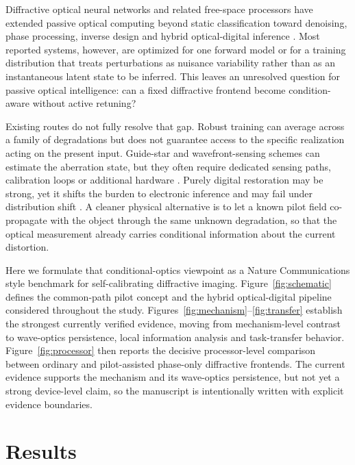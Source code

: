 \documentclass[11pt]{article}
\begin{document}
Diffractive optical neural networks and related free-space processors have extended passive optical computing beyond static classification toward denoising, phase processing, inverse design and hybrid optical-digital inference \cite{ref14,ref15,ref16,ref17,ref18,ref19,ref20,ref21,ref22,ref23}. Most reported systems, however, are optimized for one forward model or for a training distribution that treats perturbations as nuisance variability rather than as an instantaneous latent state to be inferred. This leaves an unresolved question for passive optical intelligence: can a fixed diffractive frontend become condition-aware without active retuning?

Existing routes do not fully resolve that gap. Robust training can average across a family of degradations but does not guarantee access to the specific realization acting on the present input. Guide-star and wavefront-sensing schemes can estimate the aberration state, but they often require dedicated sensing paths, calibration loops or additional hardware \cite{ref2,ref4,ref11,ref24,ref25}. Purely digital restoration may be strong, yet it shifts the burden to electronic inference and may fail under distribution shift \cite{ref12,ref13,ref27,ref28,ref29,ref30,ref31,ref32}. A cleaner physical alternative is to let a known pilot field co-propagate with the object through the same unknown degradation, so that the optical measurement already carries conditional information about the current distortion.

Here we formulate that conditional-optics viewpoint as a Nature Communications style benchmark for self-calibrating diffractive imaging. Figure~\ref{fig:schematic} defines the common-path pilot concept and the hybrid optical-digital pipeline considered throughout the study. Figures~\ref{fig:mechanism}--\ref{fig:transfer} establish the strongest currently verified evidence, moving from mechanism-level contrast to wave-optics persistence, local information analysis and task-transfer behavior. Figure~\ref{fig:processor} then reports the decisive processor-level comparison between ordinary and pilot-assisted phase-only diffractive frontends. The current evidence supports the mechanism and its wave-optics persistence, but not yet a strong device-level claim, so the manuscript is intentionally written with explicit evidence boundaries.

\section*{Results}
\end{document}
